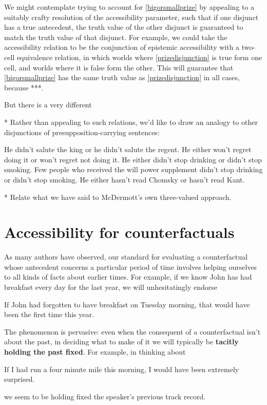 \documentclass[If.tex]{subfiles}
\begin{document}
\begin{prop}
We might contemplate trying to account for \ref{bigorsmallprize} by appealing to a suitably crafty resolution of the accessibility parameter, such that if one disjunct has a true antecedent, the truth value of the other disjunct is guaranteed to match the truth value of that disjunct.  For example, we could take the accessibility relation to be the conjunction of epistemic accessibility with a two-cell equivalence relation, in which worlds where \ref{prizedisjunction} is true form one cell, and worlds where it is false form the other.  This will guarantee that \ref{bigorsmallprize} has the same truth value as \ref{prizedisjunction} in all cases, because ***.  

But there is a very different 


* Rather than appealing to such relations, we'd like to draw an analogy to other disjunctions of presupposition-carrying sentences:
\begin{prop}
	\nitem
	He didn't salute the king or he didn't salute the regent.
	\nitem
	He either won't regret doing it or won't regret not doing it.  
	\nitem
	He either didn't stop drinking or didn't stop smoking.  
	\nitem
	Few people who received the will power supplement didn't stop drinking or didn't stop smoking.
	\nitem
	He either hasn't read Chomsky or hasn't read Kant.
\end{prop}


* Relate what we have said to McDermott's own three-valued approach.








\section{Accessibility for counterfactuals}\label{sect:cf}
As many authors have observed, our standard for evaluating a counterfactual whose antecedent concerns a particular period of time involves helping ourselves to all kinds of facts about earlier times. For example, if we know John has had breakfast every day for the last year, we will unhesitatingly endorse
\begin{prop}
	\nitem \label{breakfast}
		If John had forgotten to have breakfast on Tuesday morning, that would have been the first time this year.
\end{prop}
The phenomenon is pervasive: even when the consequent of a counterfactual isn't about the past, in deciding what to make of it we will typically be \textbf{tacitly holding the past fixed}. For example, in thinking about
\begin{prop}
	\nitem 
		If I had run a four minute mile this morning, I would have been extremely surprised.
\end{prop}
we seem to be holding fixed the speaker's previous track record.


\end{prop}
\end{document}
